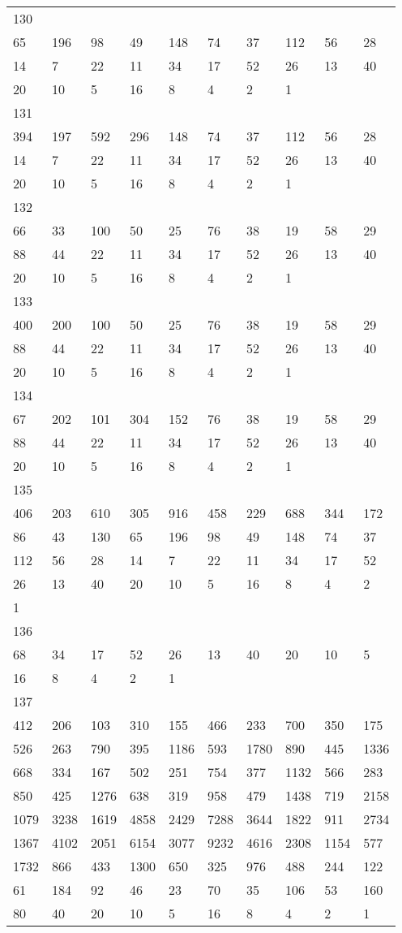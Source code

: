 \begin{longtable}{*{10}{l}}
130&&&&&&&&&\\
65& 196& 98& 49& 148& 74& 37& 112& 56& 28\\
14& 7& 22& 11& 34& 17& 52& 26& 13& 40\\
20& 10& 5& 16& 8& 4& 2& 1& \\

131&&&&&&&&&\\
394& 197& 592& 296& 148& 74& 37& 112& 56& 28\\
14& 7& 22& 11& 34& 17& 52& 26& 13& 40\\
20& 10& 5& 16& 8& 4& 2& 1& \\

132&&&&&&&&&\\
66& 33& 100& 50& 25& 76& 38& 19& 58& 29\\
88& 44& 22& 11& 34& 17& 52& 26& 13& 40\\
20& 10& 5& 16& 8& 4& 2& 1& \\

133&&&&&&&&&\\
400& 200& 100& 50& 25& 76& 38& 19& 58& 29\\
88& 44& 22& 11& 34& 17& 52& 26& 13& 40\\
20& 10& 5& 16& 8& 4& 2& 1& \\

134&&&&&&&&&\\
67& 202& 101& 304& 152& 76& 38& 19& 58& 29\\
88& 44& 22& 11& 34& 17& 52& 26& 13& 40\\
20& 10& 5& 16& 8& 4& 2& 1& \\

135&&&&&&&&&\\
406& 203& 610& 305& 916& 458& 229& 688& 344& 172\\
86& 43& 130& 65& 196& 98& 49& 148& 74& 37\\
112& 56& 28& 14& 7& 22& 11& 34& 17& 52\\
26& 13& 40& 20& 10& 5& 16& 8& 4& 2\\
1& \\

136&&&&&&&&&\\
68& 34& 17& 52& 26& 13& 40& 20& 10& 5\\
16& 8& 4& 2& 1& \\

137&&&&&&&&&\\
412& 206& 103& 310& 155& 466& 233& 700& 350& 175\\
526& 263& 790& 395& 1186& 593& 1780& 890& 445& 1336\\
668& 334& 167& 502& 251& 754& 377& 1132& 566& 283\\
850& 425& 1276& 638& 319& 958& 479& 1438& 719& 2158\\
1079& 3238& 1619& 4858& 2429& 7288& 3644& 1822& 911& 2734\\
1367& 4102& 2051& 6154& 3077& 9232& 4616& 2308& 1154& 577\\
1732& 866& 433& 1300& 650& 325& 976& 488& 244& 122\\
61& 184& 92& 46& 23& 70& 35& 106& 53& 160\\
80& 40& 20& 10& 5& 16& 8& 4& 2& 1\\


\end{longtable}
